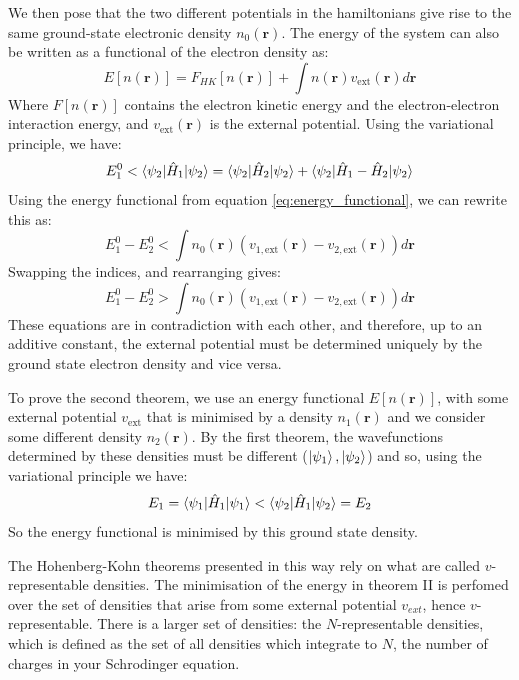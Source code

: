 \documentclass[12pt]{article}
\begin{document}
We then pose that the two different potentials in the hamiltonians give rise to the same ground-state electronic density $n_0(\mathbf r)$.
The energy of the system can also be written as a functional of the electron density as:
\begin{equation}\label{eq:energy_functional}
E[n(\mathbf r)] = F_{HK}[n(\mathbf r)]+ \int n(\mathbf r)v_{\mathrm{ext}}(\mathbf r)d\mathbf r
\end{equation}
Where $F[n(\mathbf r)]$ contains the electron kinetic energy and the electron-electron interaction energy, and $v_{\mathrm{ext}}(\mathbf r)$ is the external potential.
Using the variational principle, we have:
\begin{equation} 
	E^0_1 < \braket{\psi_2 | \hat H_1 | \psi_2} = \braket{\psi_2 | \hat H_2 | \psi_2} + \braket{\psi_2 |\hat H_1 - \hat H_2 |\psi_2}
\end{equation}
Using the energy functional from equation \ref{eq:energy_functional}, we can rewrite this as:
\begin{equation}\label{eq:contra_1}
E^0_1 - E^0_2 < \int n_0(\mathbf r)(v_{1,\mathrm{ext}}(\mathbf r)-v_{2,\mathrm{ext}}(\mathbf r)) d\mathbf r
\end{equation}
Swapping the indices, and rearranging gives:
\begin{equation}
E^0_1 - E^0_2 > \int n_0(\mathbf r)(v_{1,\mathrm{ext}}(\mathbf r)-v_{2,\mathrm{ext}}(\mathbf r)) d\mathbf r
\end{equation}
These equations are in contradiction with each other, and therefore, up to an additive constant, the external potential must be determined uniquely by the ground state electron density and vice versa.

To prove the second theorem, we use an energy functional $E[n(\mathbf r)]$, with some external potential $v_{\mathrm{ext}}$ that is minimised by a density $n_1(\mathbf r)$ and we consider some different density $n_2(\mathbf r)$. 
By the first theorem, the wavefunctions determined by these densities must be different ($\ket{\psi_1}, \ket{\psi_2}$) and so, using the variational principle we have:
\begin{equation}\label{eq:hk_2}
E_1 = \braket{\psi_1 | \hat H _1 | \psi_1} < \braket{\psi_2 | \hat H _1 | \psi_2} = E_2
\end{equation}
So the energy functional is minimised by this ground state density.

The Hohenberg-Kohn theorems presented in this way rely on what are called $v$-representable densities. The minimisation of the energy in theorem II is perfomed over the set of densities that arise from some external potential $v_{ext}$, hence $v$-representable. There is a larger set of densities: the $N$-representable densities, which is defined as the set of all densities which integrate to $N$, the number of charges in your Schrodinger equation.
\end{document}
